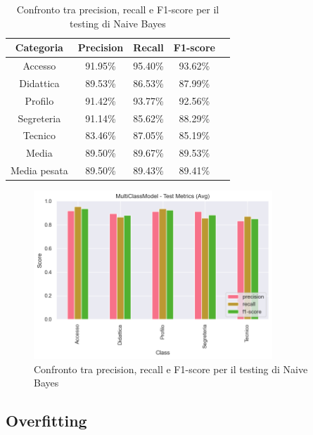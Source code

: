 \begin{table}[H]
    \centering
    \begin{tabular}{|c|c|c|c|c|}
        \hline
        \textbf{Categoria} & \textbf{Precision} & \textbf{Recall} & \textbf{F1-score} \\
        \hline
        Accesso & 91.95\% & 95.40\% & 93.62\% \\
        \hline
        Didattica & 89.53\% & 86.53\% & 87.99\% \\
        \hline
        Profilo & 91.42\% & 93.77\% & 92.56\% \\
        \hline
        Segreteria & 91.14\% & 85.62\% & 88.29\% \\
        \hline
        Tecnico & 83.46\% & 87.05\% & 85.19\% \\
        \hline
        Media & 89.50\% & 89.67\% & 89.53\% \\
        \hline
        Media pesata & 89.50\% & 89.43\% & 89.41\% \\
        \hline
    \end{tabular}
    \caption{Confronto tra precision, recall e F1-score per il testing di Naive Bayes}
    \label{tab:metriche_naive_bayes_test}
\end{table}

\begin{figure}[H]
    \centering
    \includegraphics[width=0.8\textwidth]{images/metrics_test_naive_bayes.png}
    \caption{Confronto tra precision, recall e F1-score per il testing di Naive Bayes}
    \label{fig:metrics_test_naive_bayes}
\end{figure}

\subsection{Overfitting}

